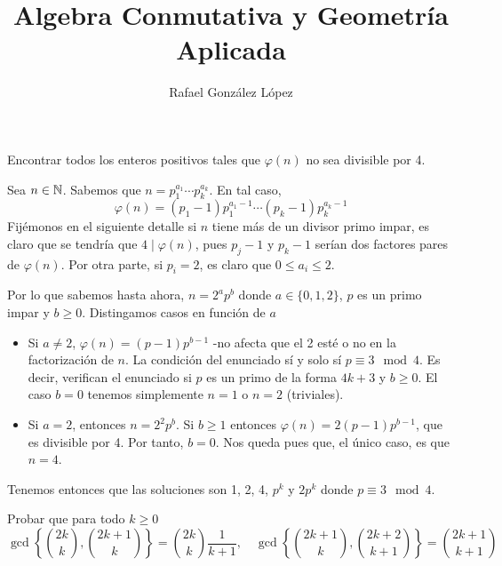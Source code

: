 \documentclass[twoside]{article}
\begin{document}
\title{Algebra Conmutativa y Geometría Aplicada}
\author{Rafael González López}
\maketitle

\begin{ejercicio}{1}
Encontrar todos los enteros positivos tales que $\varphi(n)$ no sea divisible por 4.
\begin{sol}
Sea $n\in \mathbb{N}$. Sabemos que $n=p_1^{a_1}\cdots p_k^{a_k}$. En tal caso, 
\[
\varphi(n) = (p_1-1)p_1^{a_1-1}\cdots(p_k-1)p_k^{a_k-1}
\]
Fijémonos en el siguiente detalle si $n$ tiene más de un divisor primo impar, es claro que se tendría que $4\mid \varphi(n)$, pues $p_j -1$ y $p_k-1$ serían dos factores pares de $\varphi(n)$. Por otra parte, si $p_i=2$, es claro que $0\leq a_i \leq 2$. 

Por lo que sabemos hasta ahora, $n = 2^a p^b$ donde $a\in\{0,1,2\}$, $p$ es un primo impar y $b\geq 0$. Distingamos casos en función de $a$
\begin{itemize}
\item Si $a\neq 2$, $\varphi(n) = (p-1)p^{b-1}$ -no afecta que el 2 esté o no en la factorización de $n$. La condición del enunciado sí y solo sí $p \equiv 3 \mod 4$. Es decir, verifican el enunciado si $p$ es un primo de la forma $4k + 3$ y $b\geq 0$. El caso $b=0$ tenemos simplemente $n=1$ o $n=2$ (triviales).
\item Si $a=2$, entonces $n=2^2p^b$. Si $b\geq 1$ entonces $\varphi(n)=2(p-1)p^{b-1}$, que es divisible por 4. Por tanto, $b=0$. Nos queda pues que, el único caso, es que $n=4$.
\end{itemize}
Tenemos entonces que las soluciones son 1, 2, 4, $p^k$ y $2p^k$ donde $p \equiv 3 \mod 4$.
\end{sol}
\end{ejercicio}

\newpage


\begin{ejercicio}{2}
Probar que para todo $k\geq 0$
\[
\gcd \left\{\binom{2k}{k},\binom{2k+1}{k}\right\}=\binom{2k}{k}\frac{1}{k+1}, \quad \gcd \left\{\binom{2k+1}{k},\binom{2k+2}{k+1}\right\}=\binom{2k+1}{k+1}
\]
\begin{sol}
\end{sol}
\end{ejercicio}


\newpage
\end{document}
